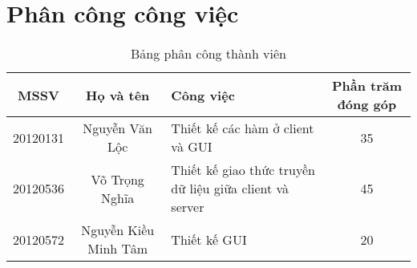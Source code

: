 \section{Phân công công việc}
\begin{table}[H]
\begin{center}
\begin{tabular}{|c|c|p{}|c|}
\hline 
MSSV & Họ và tên & Công việc & Phần trăm đóng góp \\ 
\hline 
20120131 & Nguyễn Văn Lộc & Thiết kế các hàm ở client và GUI & 35 \\ 
\hline 
20120536 & Võ Trọng Nghĩa & Thiết kế giao thức truyền dữ liệu giữa client và server & 45 \\ 
\hline 
20120572 & Nguyễn Kiều Minh Tâm & Thiết kế GUI & 20 \\ 
\hline 
\end{tabular}
\caption{Bảng phân công thành viên} 
\end{center}
\end{table}